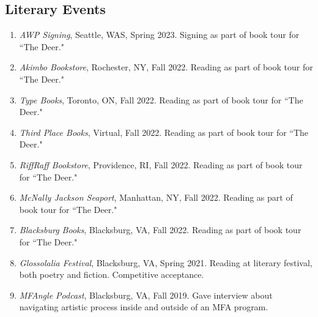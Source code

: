     \subsection{Literary Events}
    \begin{enumerate}
    \item \emph{AWP Signing}, Seattle, WAS, Spring 2023. \subitem Signing as part of book tour for ``The Deer." \\
    \item \emph{Akimbo Bookstore}, Rochester, NY, Fall 2022. \subitem Reading as part of book tour for ``The Deer." \\
    \item \emph{Type Books}, Toronto, ON, Fall 2022.  \subitem Reading as part of book tour for ``The Deer." \\
     \item \emph{Third Place Books}, Virtual, Fall 2022.  \subitem Reading as part of book tour for ``The Deer." \\
    \item \emph{RiffRaff Bookstore}, Providence, RI, Fall 2022. \subitem Reading as part of book tour for ``The Deer." \\
    \item \emph{McNally Jackson Seaport}, Manhattan, NY, Fall 2022. \subitem Reading as part of book tour for ``The Deer." \\
    \item \emph{Blacksburg Books}, Blacksburg, VA, Fall 2022. \subitem Reading as part of book tour for ``The Deer." \\
      \item  \emph{Glossolalia Festival}, Blacksburg, VA, Spring 2021. \subitem Reading at literary festival, both poetry and fiction. Competitive acceptance. \\
  \item  \emph{MFAngle Podcast}, Blacksburg, VA, Fall 2019. \subitem Gave interview about navigating artistic process inside and outside of an MFA program.
 
 \end{enumerate}
